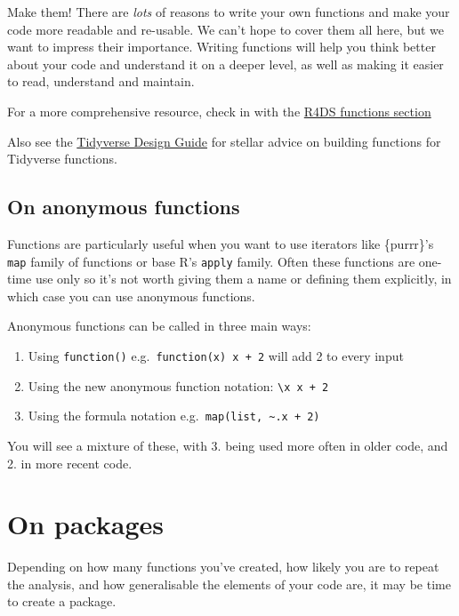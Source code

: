 \documentclass[
  letterpaper,
  DIV=11,
  numbers=noendperiod]{scrreprt}
\providecommand{\tightlist}{%
  \setlength{\itemsep}{0pt}\setlength{\parskip}{0pt}}\usepackage{longtable,booktabs,array}
\begin{document}
Make them! There are \emph{lots} of reasons to write your own functions
and make your code more readable and re-usable. We can't hope to cover
them all here, but we want to impress their importance. Writing
functions will help you think better about your code and understand it
on a deeper level, as well as making it easier to read, understand and
maintain.

For a more comprehensive resource, check in with the
\href{https://r4ds.had.co.nz/functions.html?q=functions\#functions}{R4DS
functions section}

Also see the \href{https://design.tidyverse.org/unifying.html}{Tidyverse
Design Guide} for stellar advice on building functions for Tidyverse
functions.

\subsection{On anonymous functions}\label{on-anonymous-functions}

Functions are particularly useful when you want to use iterators like
\{purrr\}'s \texttt{map} family of functions or base R's \texttt{apply}
family. Often these functions are one-time use only so it's not worth
giving them a name or defining them explicitly, in which case you can
use anonymous functions.

Anonymous functions can be called in three main ways:

\begin{enumerate}
\def\labelenumi{\arabic{enumi}.}
\tightlist
\item
  Using \texttt{function()} e.g.~\texttt{function(x)\ x\ +\ 2} will add
  2 to every input
\item
  Using the new anonymous function notation:
  \texttt{\textbackslash{}x\ x\ +\ 2}
\item
  Using the formula notation
  e.g.~\texttt{map(list,\ \textasciitilde{}.x\ +\ 2)}
\end{enumerate}

You will see a mixture of these, with 3. being used more often in older
code, and 2. in more recent code.

\section{On packages}\label{on-packages}

Depending on how many functions you've created, how likely you are to
repeat the analysis, and how generalisable the elements of your code
are, it may be time to create a package.
\end{document}
